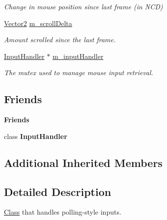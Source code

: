 \begin{Indent}
\begin{DoxyCompactItemize}
\begin{DoxyCompactList}\small\item\em Change in mouse position since last frame (in N\+CD) \end{DoxyCompactList}\item 
\mbox{\label{classrev_1_1_mouse_handler_adaef770c1d0da19093df712a1337fc58}} 
\mbox{\hyperlink{classrev_1_1_vector}{Vector2}} \mbox{\hyperlink{classrev_1_1_mouse_handler_adaef770c1d0da19093df712a1337fc58}{m\+\_\+scroll\+Delta}}
\begin{DoxyCompactList}\small\item\em Amount scrolled since the last frame. \end{DoxyCompactList}\item 
\mbox{\hyperlink{classrev_1_1_input_handler}{Input\+Handler}} $\ast$ \mbox{\hyperlink{classrev_1_1_mouse_handler_a3ea7f25610b26d1234e1789d4c41c29b}{m\+\_\+input\+Handler}}
\begin{DoxyCompactList}\small\item\em The mutex used to manage mouse input retrieval. \end{DoxyCompactList}\end{DoxyCompactItemize}
\end{Indent}
\subsection*{Friends}
\begin{Indent}\textbf{ Friends}\par
\begin{DoxyCompactItemize}
\item 
\mbox{\label{classrev_1_1_mouse_handler_a28c677eee06763681231ba62273b9fad}} 
class {\bfseries Input\+Handler}
\end{DoxyCompactItemize}
\end{Indent}
\subsection*{Additional Inherited Members}


\subsection{Detailed Description}
\mbox{\hyperlink{struct_class}{Class}} that handles polling-\/style inputs. 

